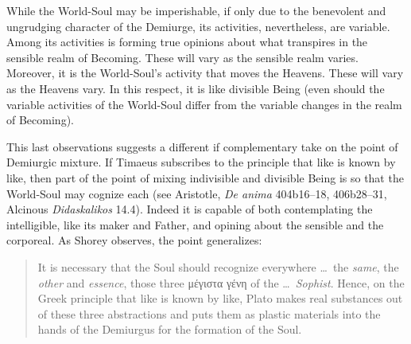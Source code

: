While the World-Soul may be imperishable, if only due to the benevolent and ungrudging character of the Demiurge, its activities, nevertheless, are variable. Among its activities is forming true opinions about what transpires in the sensible realm of Becoming. These will vary as the sensible realm varies. Moreover, it is the World-Soul's activity that moves the Heavens. These will vary as the Heavens vary. In this respect, it is like divisible Being (even should the variable activities of the World-Soul differ from the variable changes in the realm of Becoming).

This last observations suggests a different if complementary take on the point of Demiurgic mixture. If Timaeus subscribes to the principle that like is known by like, then part of the point of mixing indivisible and divisible Being is so that the World-Soul may cognize each (see Aristotle, \emph{De anima} 404b16--18, 406b28--31, Alcinous \emph{Didaskalikos} 14.4). Indeed it is capable of both contemplating the intelligible, like its maker and Father, and opining about the sensible and the corporeal. As Shorey observes, the point generalizes:
\begin{quote}
	It is necessary that the Soul should recognize everywhere \ldots\ the \emph{same}, the \emph{other} and \emph{essence}, those three {\sbl μέγιστα γένη} of the \ldots\ \emph{Sophist}. Hence, on the Greek principle that like is known by like, Plato makes real substances out of these three abstractions and puts them as plastic materials into the hands of the Demiurgus for the formation of the Soul.
\end{quote}

